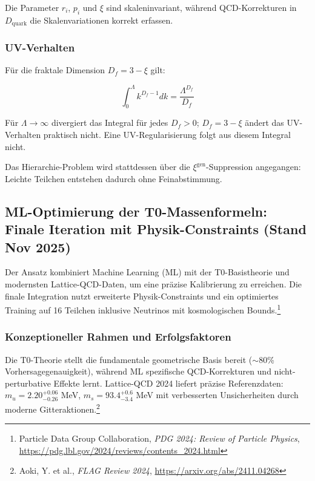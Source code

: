 	Die Parameter $r_i$, $p_i$ und $\xi$ sind skaleninvariant, während QCD-Korrekturen in $D_{\text{quark}}$ die Skalenvariationen korrekt erfassen.
	
	\subsubsection{UV-Verhalten}

	Für die fraktale Dimension $D_f = 3 - \xi$ gilt:
	
	\begin{equation}
		\int_0^\Lambda k^{D_f-1} dk = \frac{\Lambda^{D_f}}{D_f}
	\end{equation}
	
		Für $\Lambda \to \infty$ divergiert das Integral für jedes $D_f > 0$; $D_f = 3 - \xi$ ändert das UV-Verhalten praktisch nicht. Eine UV-Regularisierung folgt aus diesem Integral nicht.

	Das Hierarchie-Problem wird stattdessen über die $\xi^{\text{gen}}$-Suppression angegangen: Leichte Teilchen entstehen dadurch ohne Feinabstimmung.
	
	\subsection{ML-Optimierung der T0-Massenformeln: Finale Iteration mit Physik-Constraints (Stand Nov 2025)}
	\label{sec:ml-optimierung}
	
	Der Ansatz kombiniert Machine Learning (ML) mit der T0-Basistheorie und modernsten Lattice-QCD-Daten, um eine präzise Kalibrierung zu erreichen. Die finale Integration nutzt erweiterte Physik-Constraints und ein optimiertes Training auf 16 Teilchen inklusive Neutrinos mit kosmologischen Bounds.\footnote{Particle Data Group Collaboration, \emph{PDG 2024: Review of Particle Physics}, \url{https://pdg.lbl.gov/2024/reviews/contents\_2024.html}}
	
	\subsubsection{Konzeptioneller Rahmen und Erfolgsfaktoren}
	
	Die T0-Theorie stellt die fundamentale geometrische Basis bereit ($\sim$80\% Vorhersagegenauigkeit), während ML spezifische QCD-Korrekturen und nicht-perturbative Effekte lernt. Lattice-QCD 2024 liefert präzise Referenzdaten: $m_u=2.20^{+0.06}_{-0.26}$ MeV, $m_s=93.4^{+0.6}_{-3.4}$ MeV mit verbesserten Unsicherheiten durch moderne Gitteraktionen.\footnote{Aoki, Y. et al., \emph{FLAG Review 2024}, \url{https://arxiv.org/abs/2411.04268}}
	
